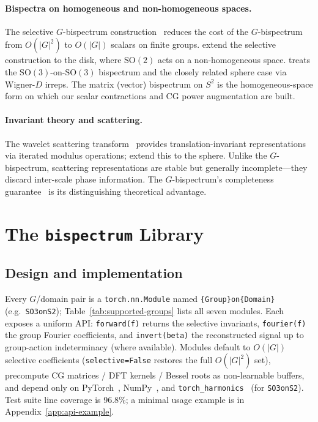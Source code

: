 \documentclass{article}
\theoremstyle{definition}
\theoremstyle{remark}
\newcommand{\SO}{\mathrm{SO}}
\theoremstyle{definition}
\begin{document}
\paragraph{Bispectra on homogeneous and non-homogeneous spaces.}
The selective $G$-bispectrum
construction~\citep{mataigne2024selective} reduces the cost of the
$G$-bispectrum from $O(|G|^2)$ to $O(|G|)$ scalars on finite groups.
\citet{myers2025selective} extend the selective construction to the
disk, where $\SO(2)$ acts on a non-homogeneous space.
\citet{kakarala2012bispectrum} treats the $\SO(3)$-on-$\SO(3)$
bispectrum and the closely related sphere case via Wigner-$D$ irreps.
The matrix (vector) bispectrum on $S^2$ is the homogeneous-space form
on which our scalar contractions and CG power augmentation are built.

\paragraph{Invariant theory and scattering.}
The wavelet scattering transform~\citep{mallat2012scattering} provides
translation-invariant representations via iterated modulus operations;
\citet{esteves2018spherical} extend this to the sphere. Unlike the
$G$-bispectrum, scattering representations are stable but generally
incomplete---they discard inter-scale phase information.
The $G$-bispectrum's completeness
guarantee~\citep{giannakis1989bispectrum, kakarala2012bispectrum} is
its distinguishing theoretical advantage.

\section{The \texttt{bispectrum} Library}
\label{sec:library}

\subsection{Design and implementation}
\label{sec:design}

Every $G$/domain pair is a \texttt{torch.nn.Module} named
\texttt{\{Group\}on\{Domain\}} (e.g.\ \texttt{SO3onS2});
Table~\ref{tab:supported-groups} lists all seven modules. Each exposes a
uniform API: \texttt{forward(f)} returns the selective invariants,
\texttt{fourier(f)} the group Fourier coefficients, and
\texttt{invert(beta)} the reconstructed signal up to group-action
indeterminacy (where available). Modules default to $O(|G|)$
selective coefficients (\texttt{selective=False} restores the full
$O(|G|^2)$ set), precompute CG matrices / DFT kernels / Bessel
roots as non-learnable buffers, and depend only on
PyTorch~\citep{paszke2019pytorch}, NumPy~\citep{harris2020numpy},
and \texttt{torch\_harmonics}~\citep{bonev2023spherical} (for
\texttt{SO3onS2}). Test suite line coverage is 96.8\%; a minimal
usage example is in Appendix~\ref{app:api-example}.
\end{document}
